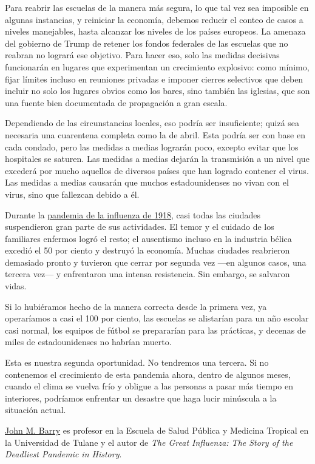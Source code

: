 Para reabrir las escuelas de la manera más segura, lo que tal vez sea
imposible en algunas instancias, y reiniciar la economía, debemos
reducir el conteo de casos a niveles manejables, hasta alcanzar los
niveles de los países europeos. La amenaza del gobierno de Trump de
retener los fondos federales de las escuelas que no reabran no logrará
ese objetivo. Para hacer eso, solo las medidas decisivas funcionarán en
lugares que experimentan un crecimiento explosivo: como mínimo, fijar
límites incluso en reuniones privadas e imponer cierres selectivos que
deben incluir no solo los lugares obvios como los bares, sino también
las iglesias, que son una fuente bien documentada de propagación a gran
escala.

Dependiendo de las circunstancias locales, eso podría ser insuficiente;
quizá sea necesaria una cuarentena completa como la de abril. Esta
podría ser con base en cada condado, pero las medidas a medias lograrán
poco, excepto evitar que los hospitales se saturen. Las medidas a medias
dejarán la transmisión a un nivel que excederá por mucho aquellos de
diversos países que han logrado contener el virus. Las medidas a medias
causarán que muchos estadounidenses no vivan con el virus, sino que
fallezcan debido a él.

Durante la
\href{https://www.nytimes.com/2020/03/17/opinion/coronavirus-1918-spanish-flu.html}{pandemia
de la influenza de 1918}, casi todas las ciudades suspendieron gran
parte de sus actividades. El temor y el cuidado de los familiares
enfermos logró el resto; el ausentismo incluso en la industria bélica
excedió el 50 por ciento y destruyó la economía. Muchas ciudades
reabrieron demasiado pronto y tuvieron que cerrar por segunda vez ---en
algunos casos, una tercera vez--- y enfrentaron una intensa resistencia.
Sin embargo, se salvaron vidas.

Si lo hubiéramos hecho de la manera correcta desde la primera vez, ya
operaríamos a casi el 100 por ciento, las escuelas se alistarían para un
año escolar casi normal, los equipos de fútbol se prepararían para las
prácticas, y decenas de miles de estadounidenses no habrían muerto.

Esta es nuestra segunda oportunidad. No tendremos una tercera. Si no
contenemos el crecimiento de esta pandemia ahora, dentro de algunos
meses, cuando el clima se vuelva frío y obligue a las personas a pasar
más tiempo en interiores, podríamos enfrentar un desastre que haga lucir
minúscula a la situación actual.

\href{http://www.johnmbarry.com/index.htm}{John M. Barry} es profesor en
la Escuela de Salud Pública y Medicina Tropical en la Universidad de
Tulane y el autor de \emph{The Great Influenza: The Story of the
Deadliest Pandemic in History}.

